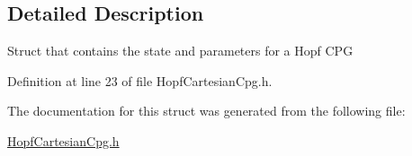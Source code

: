 \subsection{Detailed Description}
Struct that contains the state and parameters for a Hopf CPG 

Definition at line 23 of file HopfCartesianCpg.h.



The documentation for this struct was generated from the following file:\begin{DoxyCompactItemize}
\item 
\hyperlink{HopfCartesianCpg_8h}{HopfCartesianCpg.h}\end{DoxyCompactItemize}

